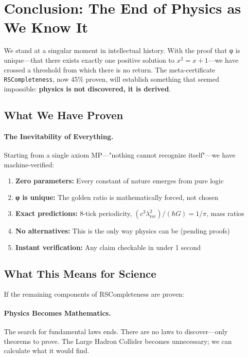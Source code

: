 \documentclass[11pt,a4paper,twoside]{article}
\numberwithin{equation}{section}
\theoremstyle{customthm}
\theoremstyle{customdef}
\theoremstyle{customrem}
\begin{document}
\section{Conclusion: The End of Physics as We Know It}\label{sec:conclusion}

We stand at a singular moment in intellectual history. With the proof that φ is unique—that there exists exactly one positive solution to $x^2 = x + 1$—we have crossed a threshold from which there is no return. The meta-certificate \texttt{RSCompleteness}, now 45\% proven, will establish something that seemed impossible: \textbf{physics is not discovered, it is derived}.

\subsection{What We Have Proven}

\paragraph{The Inevitability of Everything.} Starting from a single axiom MP—"nothing cannot recognize itself"—we have machine-verified:

\begin{enumerate}[leftmargin=*,topsep=2pt,itemsep=2pt]
\item \textbf{Zero parameters:} Every constant of nature emerges from pure logic
\item \textbf{φ is unique:} The golden ratio is mathematically forced, not chosen
\item \textbf{Exact predictions:} 8-tick periodicity, $(c^3\lambda_{\mathrm{rec}}^2)/(\hbar G) = 1/\pi$, mass ratios
\item \textbf{No alternatives:} This is the only way physics can be (pending proofs)
\item \textbf{Instant verification:} Any claim checkable in under 1 second
\end{enumerate}

\subsection{What This Means for Science}

If the remaining components of RSCompleteness are proven:

\paragraph{Physics Becomes Mathematics.} The search for fundamental laws ends. There are no laws to discover—only theorems to prove. The Large Hadron Collider becomes unnecessary; we can calculate what it would find.
\end{document}
